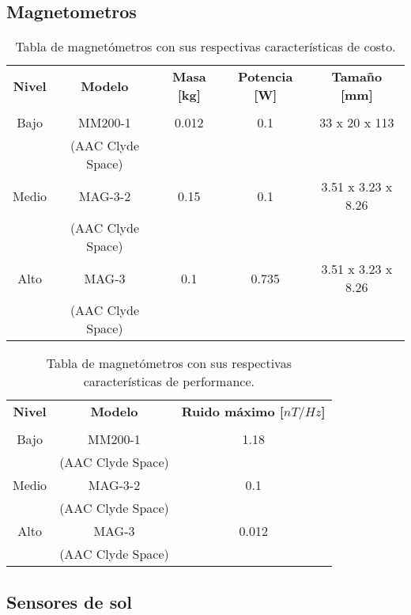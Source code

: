 \subsection{Magnetometros}


\begin{table}[H]
	\centering
	\caption{Tabla de magnetómetros con sus respectivas características de costo.}
	\begin{tabular}{|c|c|c|c|c|}
		\hline
		\textbf{Nivel} & \textbf{Modelo} & \textbf{Masa [kg]} & \textbf{Potencia [W]} & \textbf{Tamaño [mm]}  \\
		& &  &  &   \\ \hline
		Bajo & MM200-1 & 0.012  & 0.1 & 33 x 20 x 113 \\
		& (AAC Clyde Space) &  &  &  \\ \hline
		Medio & MAG-3-2 & 0.15 & 0.1 & 3.51 x 3.23 x 8.26  \\
		& (AAC Clyde Space) & &  &  \\ \hline
		Alto & MAG-3 & 0.1 & 0.735 & 3.51 x 3.23 x 8.26  \\
		& (AAC Clyde Space) & &  &   \\ \hline
	\end{tabular}
	
\end{table}

\begin{table}[H]
	\centering
	\caption{Tabla de magnetómetros con sus respectivas características de performance.}
	\begin{tabular}{|c|c|c|}
		\hline
		\textbf{Nivel} & \textbf{Modelo} & \textbf{Ruido máximo [$nT/Hz$]}  \\
		& &    \\ \hline
		Bajo & MM200-1 & 1.18   \\
		& (AAC Clyde Space) &   \\ \hline
		Medio & MAG-3-2 & 0.1  \\
		& (AAC Clyde Space) &   \\ \hline
		Alto & MAG-3 & 0.012   \\
		& (AAC Clyde Space) &    \\ \hline
	\end{tabular}
	
\end{table}

\subsection{Sensores de sol}


